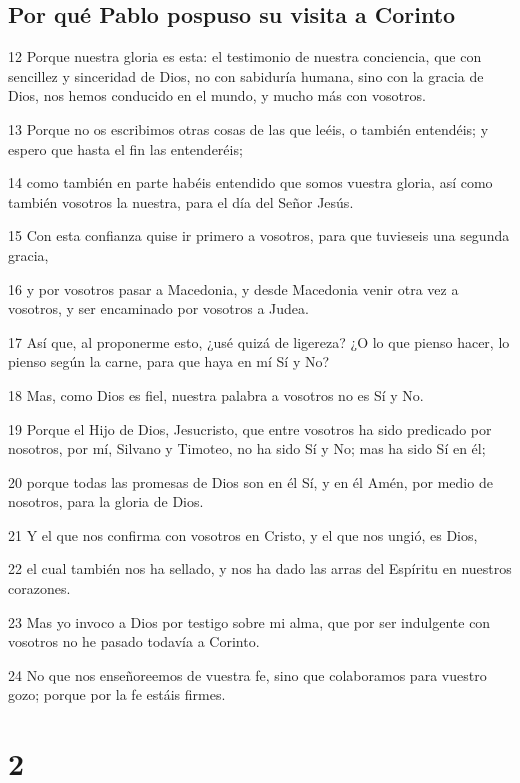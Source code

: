 \section*{Por qué Pablo pospuso su visita a Corinto}

\par 12 Porque nuestra gloria es esta: el testimonio de nuestra conciencia, que con sencillez y sinceridad de Dios, no con sabiduría humana, sino con la gracia de Dios, nos hemos conducido en el mundo, y mucho más con vosotros.
\par 13 Porque no os escribimos otras cosas de las que leéis, o también entendéis; y espero que hasta el fin las entenderéis;
\par 14 como también en parte habéis entendido que somos vuestra gloria, así como también vosotros la nuestra, para el día del Señor Jesús.
\par 15 Con esta confianza quise ir primero a vosotros, para que tuvieseis una segunda gracia,
\par 16 y por vosotros pasar a Macedonia, y desde Macedonia venir otra vez a vosotros, y ser encaminado por vosotros a Judea.
\par 17 Así que, al proponerme esto, ¿usé quizá de ligereza? ¿O lo que pienso hacer, lo pienso según la carne, para que haya en mí Sí y No?
\par 18 Mas, como Dios es fiel, nuestra palabra a vosotros no es Sí y No.
\par 19 Porque el Hijo de Dios, Jesucristo, que entre vosotros ha sido predicado por nosotros, por mí, Silvano y Timoteo, no ha sido Sí y No; mas ha sido Sí en él;
\par 20 porque todas las promesas de Dios son en él Sí, y en él Amén, por medio de nosotros, para la gloria de Dios.
\par 21 Y el que nos confirma con vosotros en Cristo, y el que nos ungió, es Dios,
\par 22 el cual también nos ha sellado, y nos ha dado las arras del Espíritu en nuestros corazones.
\par 23 Mas yo invoco a Dios por testigo sobre mi alma, que por ser indulgente con vosotros no he pasado todavía a Corinto.
\par 24 No que nos enseñoreemos de vuestra fe, sino que colaboramos para vuestro gozo; porque por la fe estáis firmes.

\chapter{2}

